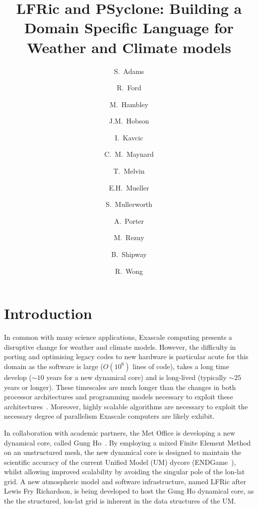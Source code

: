 \documentclass[times]{elsarticle}
\begin{document}
\begin{frontmatter}

\title{LFRic and PSyclone: Building a Domain Specific Language for Weather and Climate models}

\author[met]{S.~Adams}
\author[hartree]{R.~Ford}
\author[met]{M.~Hambley}
\author[met]{J.M.~Hobson}
\author[met]{I.~Kavcic}
\author[met,read]{C.~M.~Maynard}
\author[met]{T.~Melvin}
\author[bath]{E.H.~Mueller}
\author[met]{S.~Mullerworth}
\author[hartree]{A.~Porter}
\author[downunder]{M.~Rezny}
\author[met]{B.~Shipway}
\author[met]{R.~Wong}




\address[met]{Met Office, FitzRoy Road, Exeter, EX1 3PB}
\address[read]{Department of Computer Science, Polly Vacher Building,
  University of Reading, Reading, UK, RG6 6AY}
\address[bath]{Department of Mathematics, University of Bath, Bath}
\address[downunder]{University of Monash, Melbourne, Australia}
\address[hartree]{Hartree Centre, STFC Daresbury, Grim up North}

\begin{abstract}
\end{abstract}

\begin{keyword}

\end{keyword}

\end{frontmatter}

\section{Introduction}
In common with many science applications, Exascale computing presents
a disruptive change for weather and climate models. However, the
difficulty in porting and optimising legacy codes to new hardware is
particular acute for this domain as the software is large ($O(10^6)$
lines of code), takes a long time develop ($\sim 10$ years for a new
dynamical core) and is long-lived (typically $\sim 25$ years or longer). These
timescales are much longer than the changes in both processor
architectures and programming models necessary to exploit these
architectures~\cite{gmd-2017-186}. Moreover, highly scalable
algorithms are necessary to exploit the necessary degree of
parallelism Exascale computers are likely exhibit.

In collaboration with academic partners, the Met Office is developing
a new dynamical core, called Gung Ho~\cite{MELVIN2018342}. By
employing a mixed Finite Element Method on an unstructured mesh, the
new dynamical core is designed to maintain the scientific accuracy of
the current Unified Model (UM) dycore (ENDGame~\cite{QJ:QJ2235}),
whilst allowing improved scalability by avoiding the singular pole of
the lon-lat grid. A new atmospheric model and software infrastructure,
named LFRic after Lewis Fry Richardson, is being developed to host the
Gung Ho dynamical core, as the the structured, lon-lat grid is inherent in the
data structures of the UM.
\end{document}

